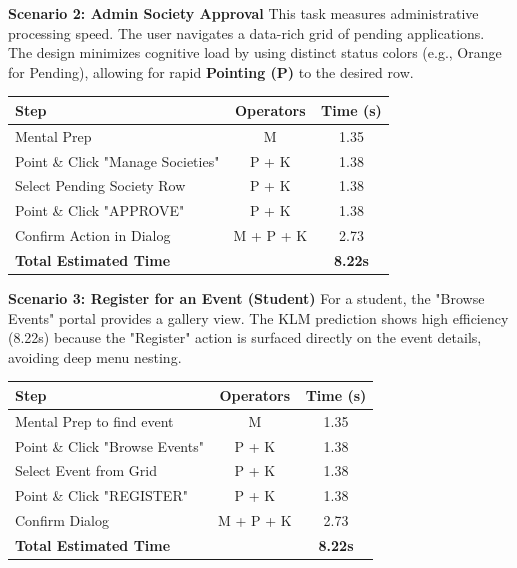 \documentclass[12pt,a4paper]{article}
\begin{document}
\textbf{Scenario 2: Admin Society Approval}
This task measures administrative processing speed. The user navigates a data-rich grid of pending applications. The design minimizes cognitive load by using distinct status colors (e.g., Orange for Pending), allowing for rapid \textbf{Pointing (P)} to the desired row.
\begin{table}[H]
\centering
\begin{tabular}{lcc}
\toprule
\textbf{Step} & \textbf{Operators} & \textbf{Time (s)} \\
\midrule
Mental Prep & M & 1.35 \\
Point \& Click "Manage Societies" & P + K & 1.38 \\
Select Pending Society Row & P + K & 1.38 \\
Point \& Click "APPROVE" & P + K & 1.38 \\
Confirm Action in Dialog & M + P + K & 2.73 \\
\midrule
\textbf{Total Estimated Time} & & \textbf{8.22s} \\
\bottomrule
\end{tabular}
\end{table}

\textbf{Scenario 3: Register for an Event (Student)}
For a student, the "Browse Events" portal provides a gallery view. The KLM prediction shows high efficiency (8.22s) because the "Register" action is surfaced directly on the event details, avoiding deep menu nesting.
\begin{table}[H]
\centering
\begin{tabular}{lcc}
\toprule
\textbf{Step} & \textbf{Operators} & \textbf{Time (s)} \\
\midrule
Mental Prep to find event & M & 1.35 \\
Point \& Click "Browse Events" & P + K & 1.38 \\
Select Event from Grid & P + K & 1.38 \\
Point \& Click "REGISTER" & P + K & 1.38 \\
Confirm Dialog & M + P + K & 2.73 \\
\midrule
\textbf{Total Estimated Time} & & \textbf{8.22s} \\
\bottomrule
\end{tabular}
\end{table}
\end{document}
